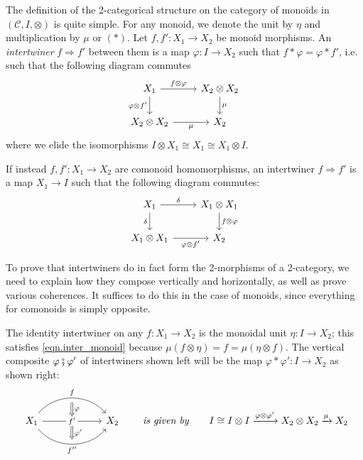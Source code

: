 \documentclass[11pt, one side, article]{memoir}
\theoremstyle{definition}
\theoremstyle{plain}
\newenvironment{definition}
  {\pushQED{\qed}\renewcommand{\qedsymbol}{$\lozenge$}\definitionx}
  {\popQED\enddefinitionx}
\newcommand{\cat}[1]{\mathcal{#1}}%
\newcommand{\then}{\mathbin{\fatsemi}}
\newcommand{\To}[2][]{\xrightarrow[#1]{#2}}
\newcommand{\imp}{\Rightarrow}
\newcommand{\tn}[1]{\textnormal{#1}}
\newcommand{\0}{\textsf{0}}
\newcommand{\1}{\tn{\textsf{1}}}
\newcommand{\hh}[2][]{#1 \tn{\textit{#2}} #1}
\newcommand{\qqby}{\hh[\qquad]{is given by}}
\begin{document}
The definition of the 2-categorical structure on the category of monoids in $(\cat{C},I,\otimes)$ is quite simple. For any monoid, we denote the unit by $\eta$ and multiplication by $\mu$ or $(*)$.
\begin{definition}
Let $f,f'\colon X_1\to X_2$ be monoid morphisms. An \emph{intertwiner} $f\imp f'$ between them is a map $\varphi\colon I\to X_2$ such that  $f*\varphi=\varphi*f'$, i.e. such that the following diagram commutes
\begin{equation}\label{eqn.inter_monoid}
\begin{tikzcd}
	X_1\ar[r, "f\otimes \varphi"]\ar[d, "\varphi\otimes f'"']&
	X_2\otimes X_2\ar[d, "\mu"]\\
	X_2\otimes X_2\ar[r, "\mu"']&
	X_2
\end{tikzcd}
\end{equation}
where we elide the isomorphisms $I\otimes X_1\cong X_1\cong X_1\otimes I$.
\end{definition}

If instead $f,f'\colon X_1\to X_2$ are comonoid homomorphisms, an intertwiner $f\imp f'$ is a map $X_1\to I$ such that the following diagram commutes:
\begin{equation}\label{eqn.inter_comonoid}
\begin{tikzcd}
	X_1\ar[r, "\delta"]\ar[d, "\delta"']&
	X_1\otimes X_1\ar[d, "f\otimes\varphi"]\\
	X_1\otimes X_1\ar[r, "\varphi\otimes f'"']&
	X_2
\end{tikzcd}
\end{equation}

To prove that intertwiners do in fact form the 2-morphisms of a 2-category, we need to explain how they compose vertically and horizontally, as well as prove various coherences. It suffices to do this in the case of monoids, since everything for comonoids is simply opposite.

The identity intertwiner on any $f\colon X_1\to X_2$ is the monoidal unit $\eta\colon I\to X_2$; this satisfies \eqref{eqn.inter_monoid} because $\mu(f\otimes\eta)=f=\mu(\eta\otimes f)$. The vertical composite $\varphi\then\varphi'$ of intertwiners shown left will be the map $\varphi*\varphi'\colon I\to X_2$ as shown right:
\begin{equation}\label{eqn.def_vert}
\begin{tikzcd}[column sep=60pt]
	X_1\ar[r, bend left=50pt, "f", ""' name=a]\ar[r, "f'" description, "" name=b1, ""' name=b2]\ar[r, bend right=50pt, "f''"', "" name=c]&
	X_2
	\ar[from=a, to=b1, Rightarrow, "\varphi"]
	\ar[from=b2, to=c, Rightarrow, "\varphi'"]
\end{tikzcd}
\qqby
	I\cong I\otimes I\To{\varphi\otimes\varphi'}X_2\otimes X_2\To{\mu}X_2
\end{equation}
\end{document}
